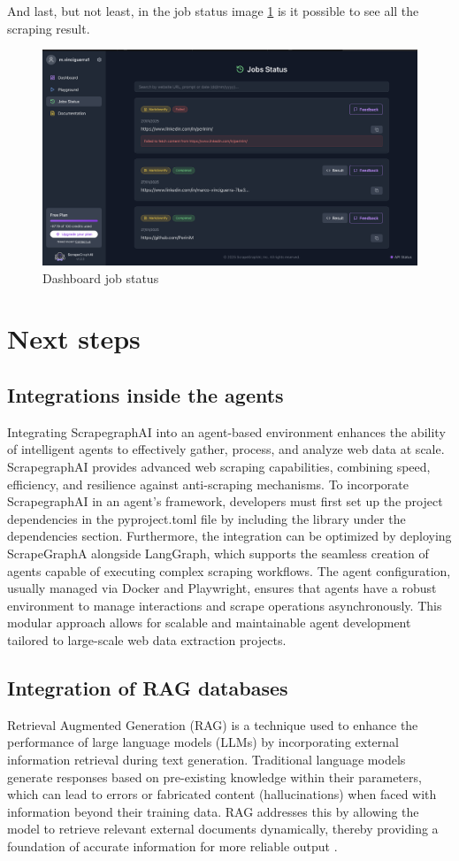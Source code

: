 And last, but not least, in the job status image \ref{fig:enter-dashboard-status} is it possible to see all the scraping result.
\begin{figure}[h!]
    \centering
    \includegraphics[width=0.95\linewidth]{Assets/dashboard_3.png}
    \caption{Dashboard job status}
    \label{fig:enter-dashboard-status}
\end{figure}

\section{Next steps}
\subsection{Integrations inside the agents}
Integrating ScrapegraphAI  into an agent-based environment enhances the ability of intelligent agents to effectively gather, process, and analyze web data at scale. ScrapegraphAI  provides advanced web scraping capabilities, combining speed, efficiency, and resilience against anti-scraping mechanisms. To incorporate ScrapegraphAI  in an agent's framework, developers must first set up the project dependencies in the pyproject.toml file by including the library under the dependencies section. Furthermore, the integration can be optimized by deploying ScrapeGraphA alongside LangGraph, which supports the seamless creation of agents capable of executing complex scraping workflows. The agent configuration, usually managed via Docker and Playwright, ensures that agents have a robust environment to manage interactions and scrape operations asynchronously. This modular approach allows for scalable and maintainable agent development tailored to large-scale web data extraction projects.

\subsection{Integration of RAG databases}
Retrieval Augmented Generation (RAG) is a technique used to enhance the performance of large language models (LLMs) by incorporating external information retrieval during text generation. Traditional language models generate responses based on pre-existing knowledge within their parameters, which can lead to errors or fabricated content (hallucinations) when faced with information beyond their training data. RAG addresses this by allowing the model to retrieve relevant external documents dynamically, thereby providing a foundation of accurate information for more reliable output \cite{23}.

